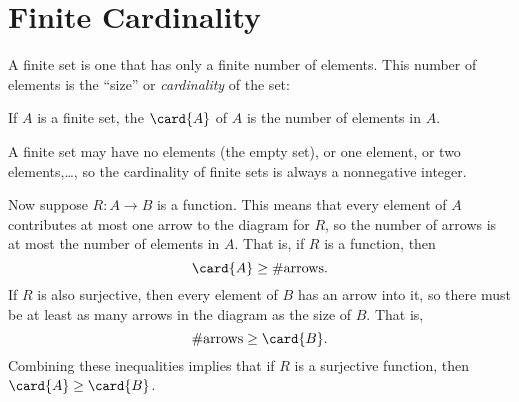 \iffalse
It gets interesting when we write composite expressions mixing images,
inverse images and set operations.  For example, $T(\inv{T}(D))$ is
the set of Spring '09 subjects that have an instructor in charge who
also is in in charge of an introductory subject.  So $T(\inv{T}(D)) -
D$ are the advanced subjects with someone in-charge who is also
in-charge of an introductory subject.  Similarly, $\inv{T}(D) \intersect
\inv{T}(N-D)$ is the set of faculty in charge of both an introductory \emph{and}
an advanced subject in Spring '09.
\fi

\begin{problems}
\practiceproblems
{}

\classproblems
{}

\homeworkproblems

\examproblems
{}
\end{problems}


\section{Finite Cardinality}\label{mappingrule_sec}
A finite set is one that has only a finite number of elements.  This
number of elements is the ``size'' or \emph{cardinality} of the set:
\begin{definition}\label{fin_card_def}
If $A$ is a finite set, the  $\card{A}$ of $A$ is
the number of elements in $A$.
\end{definition}
A finite set may have no elements (the empty set), or one element, or
two elements,\dots, so the cardinality of finite sets is always a
nonnegative integer.

Now suppose $R:A \to B$ is a function.  This means that every element
of $A$ contributes at most one arrow to the diagram for $R$, so the
number of arrows is at most the number of elements in $A$.  That is,
if $R$ is a function, then
\[
\card{A} \geq \#\text{arrows}.
\]
If $R$ is also surjective, then every element of $B$ has an arrow into
it, so there must be at least as many arrows in the diagram as the
size of $B$.  That is,
\[
\#\text{arrows} \geq \card{B}.
\]
Combining these inequalities implies that if $R$ is a surjective
function, then $\card{A} \geq \card{B}$.

